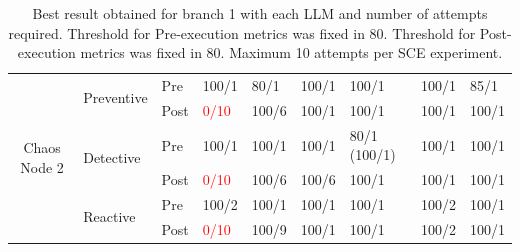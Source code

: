 \begin{table}[]
\begin{tabular}{cll|ll|ll|ll|}
\multicolumn{1}{|c|}{\multirow{6}{*}{Chaos Node 2}} & \multicolumn{1}{l|}{\multirow{2}{*}{Preventive}} & Pre  & \multicolumn{1}{l|}{100/1} & 80/1                     & \multicolumn{1}{l|}{100/1}& 100/1                    & \multicolumn{1}{l|}{100/1}& 85/1                     \\ \cline{3-9} 
\multicolumn{1}{|c|}{}                              & \multicolumn{1}{l|}{}                            & Post & \multicolumn{1}{l|}{\textcolor{red}{0/10}}  & 100/6       & \multicolumn{1}{l|}{100/1}& 100/1                    & \multicolumn{1}{l|}{100/1}& 100/1                    \\ \cline{2-9} 
\multicolumn{1}{|c|}{}                              & \multicolumn{1}{l|}{\multirow{2}{*}{Detective}}  & Pre  & \multicolumn{1}{l|}{100/1} & 100/1                    & \multicolumn{1}{l|}{100/1}& 80/1 (100/1)                     & \multicolumn{1}{l|}{100/1}& 100/1                    \\ \cline{3-9} 
\multicolumn{1}{|c|}{}                              & \multicolumn{1}{l|}{}                            & Post & \multicolumn{1}{l|}{\textcolor{red}{0/10}}  & 100/6       & \multicolumn{1}{l|}{100/6}& 100/1                    & \multicolumn{1}{l|}{100/1}& 100/1                    \\ \cline{2-9} 
\multicolumn{1}{|c|}{}                              & \multicolumn{1}{l|}{\multirow{2}{*}{Reactive}}   & Pre  & \multicolumn{1}{l|}{100/2} & 100/1                    & \multicolumn{1}{l|}{100/1}& 100/1                    & \multicolumn{1}{l|}{100/2}& 100/1                    \\ \cline{3-9} 
\multicolumn{1}{|c|}{}                              & \multicolumn{1}{l|}{}                            & Post & \multicolumn{1}{l|}{\textcolor{red}{0/10}}  & 100/9      & \multicolumn{1}{l|}{100/1}& 100/1                    & \multicolumn{1}{l|}{100/2}& 100/1                    \\ \hline
\end{tabular}
\caption{Best result obtained for branch 1 with each LLM and number of attempts required. Threshold for Pre-execution metrics was fixed in 80. Threshold for Post-execution metrics was fixed in 80. Maximum 10 attempts per SCE experiment.}
\label{tab:ConsolidatedResults}
\end{table}


\documentclass[a4paper]{article}
\usepackage{xcolor}
\usepackage{multirow}
\usepackage{booktabs}
\usepackage{geometry}
\usepackage{caption}
\geometry{landscape, margin=1.5cm}

